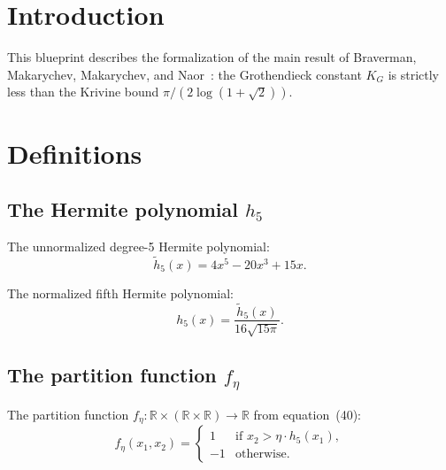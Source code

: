 
\chapter{Introduction}

This blueprint describes the formalization of the main result of
Braverman, Makarychev, Makarychev, and Naor~\cite{BMMN2011}:
the Grothendieck constant $K_G$ is strictly less than
the Krivine bound $\pi/(2\log(1+\sqrt{2}))$.

\chapter{Definitions}

\section{The Hermite polynomial \texorpdfstring{$h_5$}{h\_5}}

\begin{definition}
  \label{def:h5_unnorm}
  \leanok
  The unnormalized degree-5 Hermite polynomial:
  \[
    \tilde{h}_5(x) = 4x^5 - 20x^3 + 15x.
  \]
\end{definition}

\begin{definition}
  \label{def:h5}
  \leanok
  The normalized fifth Hermite polynomial:
  \[
    h_5(x) = \frac{\tilde{h}_5(x)}{16\sqrt{15\pi}}.
  \]
\end{definition}

\section{The partition function \texorpdfstring{$f_\eta$}{f\_eta}}

\begin{definition}
  \label{def:f_eta}
  \leanok
  The partition function $f_\eta : \mathbb{R} \times (\mathbb{R} \times \mathbb{R}) \to \mathbb{R}$
  from equation~(40):
  \[
    f_\eta(x_1, x_2) =
    \begin{cases}
      1 & \text{if } x_2 > \eta \cdot h_5(x_1), \\
      -1 & \text{otherwise.}
    \end{cases}
  \]
\end{definition}

